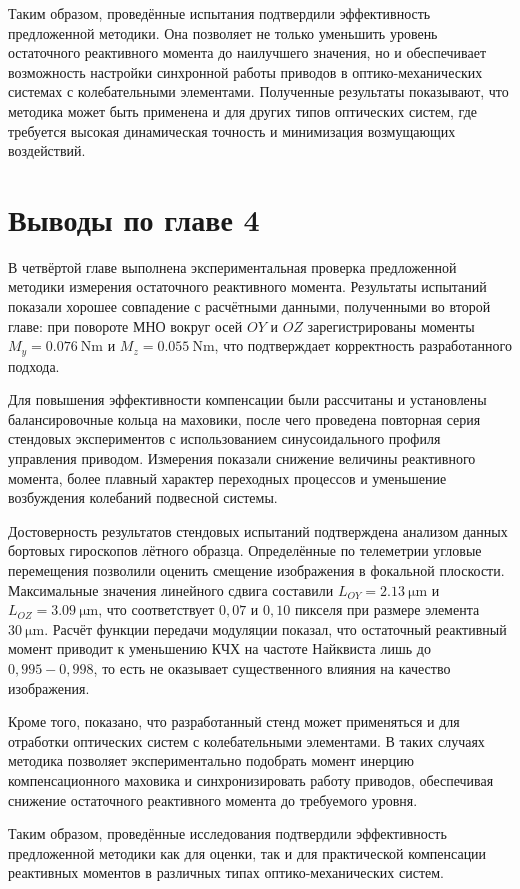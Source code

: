  Таким образом, проведённые испытания подтвердили эффективность предложенной методики. Она позволяет не только уменьшить уровень остаточного реактивного момента до наилучшего значения, но и обеспечивает возможность настройки синхронной работы приводов в оптико-механических системах с колебательными элементами. Полученные результаты показывают, что методика может быть применена и для других типов оптических систем, где требуется высокая динамическая точность и минимизация возмущающих воздействий.
 
 
 \section*{Выводы по главе 4}
 
В четвёртой главе выполнена экспериментальная проверка предложенной методики измерения остаточного реактивного момента. Результаты испытаний показали хорошее совпадение с расчётными данными, полученными во второй главе: при повороте МНО вокруг осей $OY$ и $OZ$ зарегистрированы моменты $M_y = \SI{0,076}{\newton\meter}$ и $M_z=\SI{0,055}{\newton\meter}$, что подтверждает корректность разработанного подхода.

Для повышения эффективности компенсации были рассчитаны и установлены балансировочные кольца на маховики, после чего проведена повторная серия стендовых экспериментов с использованием синусоидального профиля управления приводом. Измерения показали снижение величины реактивного момента, более плавный характер переходных процессов и уменьшение возбуждения колебаний подвесной системы. 

Достоверность результатов стендовых испытаний подтверждена анализом данных бортовых гироскопов лётного образца. Определённые по телеметрии угловые перемещения позволили оценить смещение изображения в фокальной плоскости. Максимальные значения линейного сдвига составили $L_{OY} = \SI{2,13}{\micro\meter}$ и $L_{OZ} = \SI{3,09}{\micro\meter}$, что соответствует $0,07$ и $0,10$ пикселя при размере элемента $\SI{30}{\micro\meter}$.
Расчёт функции передачи модуляции показал, что остаточный реактивный момент приводит к уменьшению 
КЧХ на частоте Найквиста лишь до $0,995-0,998$, то есть не оказывает существенного влияния на качество изображения.
 
Кроме того, показано, что разработанный стенд может применяться и для отработки оптических систем с колебательными элементами. В таких случаях методика позволяет экспериментально подобрать момент инерцию компенсационного маховика и синхронизировать работу приводов, обеспечивая снижение остаточного реактивного момента до требуемого уровня.

Таким образом, проведённые исследования подтвердили эффективность предложенной методики как для оценки, так и для практической компенсации реактивных моментов в различных типах оптико-механических систем.
 
 
\FloatBarrier




